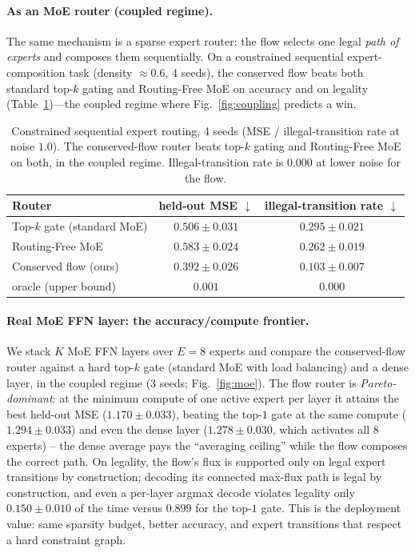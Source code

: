 \documentclass{article} %
\begin{document}
\paragraph{As an MoE router (coupled regime).} The same mechanism is a sparse expert router:
the flow selects one legal \emph{path of experts} and composes them sequentially. On a constrained
sequential expert-composition task (density $\approx\!0.6$, 4 seeds), the conserved flow beats both
standard top-$k$ gating and Routing-Free MoE on accuracy and on legality (Table~\ref{tab:moe})---the
coupled regime where Fig.~\ref{fig:coupling} predicts a win.
\begin{table}[t]\centering
\begin{tabular}{lcc}
\toprule
Router & held-out MSE $\downarrow$ & illegal-transition rate $\downarrow$ \\
\midrule
Top-$k$ gate (standard MoE) & $0.506\pm0.031$ & $0.295\pm0.021$ \\
Routing-Free MoE & $0.583\pm0.024$ & $0.262\pm0.019$ \\
Conserved flow (ours) & $\mathbf{0.392\pm0.026}$ & $\mathbf{0.103\pm0.007}$ \\
\midrule
oracle (upper bound) & $0.001$ & $0.000$ \\
\bottomrule
\end{tabular}
\caption{Constrained sequential expert routing, 4 seeds (MSE / illegal-transition rate at noise
$1.0$). The conserved-flow router beats top-$k$ gating and Routing-Free MoE on both, in the coupled
regime. Illegal-transition rate is $0.000$ at lower noise for the flow.}
\label{tab:moe}
\end{table}

\paragraph{Real MoE FFN layer: the accuracy/compute frontier.} We stack $K$ MoE FFN layers over
$E{=}8$ experts and compare the conserved-flow router against a hard top-$k$ gate (standard MoE
with load balancing) and a dense layer, in the coupled regime (3 seeds; Fig.~\ref{fig:moe}). The
flow router is \emph{Pareto-dominant}: at the minimum compute of one active expert per layer it
attains the best held-out MSE ($1.170\pm0.033$), beating the top-$1$ gate at the same compute
($1.294\pm0.033$) and even the dense layer ($1.278\pm0.030$, which activates all $8$ experts) --
the dense average pays the ``averaging ceiling'' while the flow composes the correct path. On
legality, the flow's flux is supported only on legal expert transitions by construction; decoding
its connected max-flux path is legal by construction, and even a per-layer argmax decode violates
legality only $0.150\pm0.010$ of the time versus $0.899$ for the top-$1$ gate. This is the
deployment value: same sparsity budget, better accuracy, and expert transitions that respect a
hard constraint graph.
\end{document}
